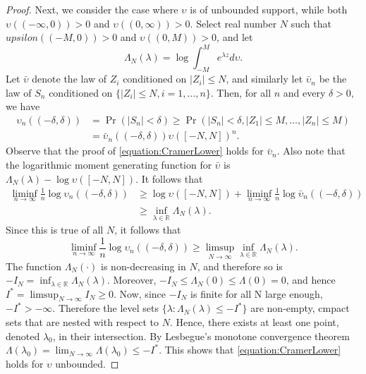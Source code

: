 \begin{proof}
Next, we consider the case where $\upsilon$ is of unbounded support, while both $\upsilon((- \infty,0)) > 0$ and $\upsilon ((0, \infty)) > 0$.
Select real number $N$ such that $upsilon((- M,0)) > 0$ and $\upsilon ((0, M)) > 0$, and let
\begin{equation*}
\Lambda_N (\lambda) = \log \int_{- M}^M e^{\lambda z} d \upsilon .
\end{equation*}
Let $\bar{\upsilon}$ denote the law of $Z_i$ conditioned on $|Z_i| \leq N$, and similarly let $\bar{\upsilon}_n$ be the law of $S_n$ conditioned on $\{ |Z_i| \leq N , i = 1, \ldots, n \}$.
Then, for all $n$ and every $\delta > 0$, we have
\begin{equation*}
\begin{split}
\upsilon_n ((- \delta, \delta))
&= \Pr (|S_n| < \delta)
\geq \Pr (|S_n| < \delta, |Z_1| \leq M, \ldots, |Z_n| \leq M) \\
&= \bar{\upsilon}_n ((- \delta, \delta)) \upsilon([-N, N])^n .
\end{split}
\end{equation*}
Observe that the proof of \eqref{equation:CramerLower} holds for $\bar{\upsilon}_n$.
Also note that the logarithmic moment generating function for $\bar{\upsilon}$ is $\Lambda_N(\lambda) - \log \upsilon ([-N,N])$.
It follows that
\begin{equation*}
\begin{split}
\liminf_{n \rightarrow \infty} \frac{1}{n} \log \upsilon_n ((- \delta, \delta))
&\geq \log \upsilon([-N,N]) + \liminf_{n \rightarrow \infty}
\frac{1}{n} \log \bar{\upsilon}_n ((- \delta, \delta)) \\
&\geq \inf_{\lambda \in \mathbb{R}} \Lambda_{N} (\lambda) .
\end{split}
\end{equation*}
Since this is true of all $N$, it follows that
\begin{equation*}
\liminf_{n \rightarrow \infty} \frac{1}{n} \log \upsilon_n ((- \delta, \delta))
\geq \limsup_{N \rightarrow \infty}
\inf_{\lambda \in \mathbb{R}} \Lambda_{N} (\lambda) .
\end{equation*}
The function $\Lambda_N (\cdot)$ is non-decreasing in $N$, and therefore so is $- I_N = \inf_{\lambda \in \mathbb{R}} \Lambda_N (\lambda)$.
Moreover, $-I_N \leq \Lambda_N(0) \leq \Lambda (0) = 0$, and hence $I^* = \limsup_{N \rightarrow \infty} I_N \geq 0$.
Now, since $-I_N$ is finite for all N large enough, $-I^* > - \infty$.
Therefore the level sets $\{ \lambda : \Lambda_N (\lambda) \leq - I^* \}$ are non-empty, cmpact sets that are nested with respect to $N$.
Hence, there exists at least one point, denoted $\lambda_0$, in their intersection.
By Lesbegue's monotone convergence theorem $\Lambda(\lambda_0) = \lim_{N \rightarrow \infty} \Lambda (\lambda_0) \leq -I^*$.
This shows that \eqref{equation:CramerLower} holds for $\upsilon$ unbounded.


\end{proof}
